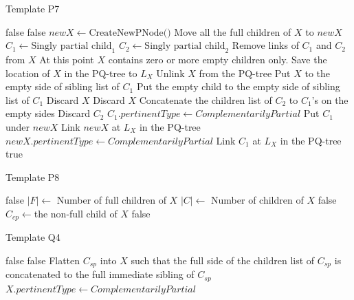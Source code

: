\documentclass[a4]{jgaa-art}
\begin{document}
\begin{algorithm}
\caption{Template P7}\label{template_P7}
\begin{algorithmic}[1]
 \Return false
\EndIf
{} \Return false
\EndIf
\State $newX \gets \text{CreateNewPNode()}$
\State Move all the full children of $X$ to $newX$
\State $C_1 \gets \text{Singly partial child}_1$
\State $C_2 \gets \text{Singly partial child}_2$
\State Remove links of $C_1$ and $C_2$ from $X$
\LineComment At this point $X$ contains zero or more empty children only.
\State Save the location of $X$ in the PQ-tree to $L_X$
\State Unlink $X$ from the PQ-tree
\State Put $X$ to the empty side of sibling list of $C_1$
\State Put the empty child to the empty side of sibling list of $C_1$
\State Discard $X$
\Else
\State Discard $X$
\EndIf
\State Concatenate the children list of $C_2$ to $C_1$'s on the empty sides
\State Discard $C_2$
\State $C_1.pertinentType \gets \textit{ComplementarilyPartial}$
\State Put $C_1$ under $newX$
\State Link $newX$ at $L_X$ in the PQ-tree
\State $newX.pertinentType \gets \textit{ComplementarilyPartial}$
\Else
\State Link $C_1$ at $L_X$ in the PQ-tree
\EndIf
\Return true
\EndProcedure
\end{algorithmic}
\end{algorithm}


\begin{algorithm}
\caption{Template P8}\label{template_P8}
\begin{algorithmic}[1]
 \Return false
\EndIf
\State $|F| \gets $ Number of full children of $X$
\State $|C| \gets $ Number of children of $X$
 \Return false
\EndIf
\State $C_{cp} \gets $the non-full child of $X$
 \Return false
\EndIf
{}
\State{}
\EndProcedure
\end{algorithmic}
\end{algorithm}


\begin{algorithm}
\caption{Template Q4}\label{template_Q4}
\begin{algorithmic}[1]
 \Return false
\EndIf
{}
\Return false
\EndIf
{}
\State Flatten $C_{sp}$ into $X$ such that the full side of the children list
of $C_{sp}$ is concatenated to the full immediate sibling of $C_{sp}$
\EndFor
\State $X.pertinentType \gets \textit{ComplementarilyPartial}$
\State {}
\EndProcedure
\end{algorithmic}
\end{algorithm}
\end{document}
